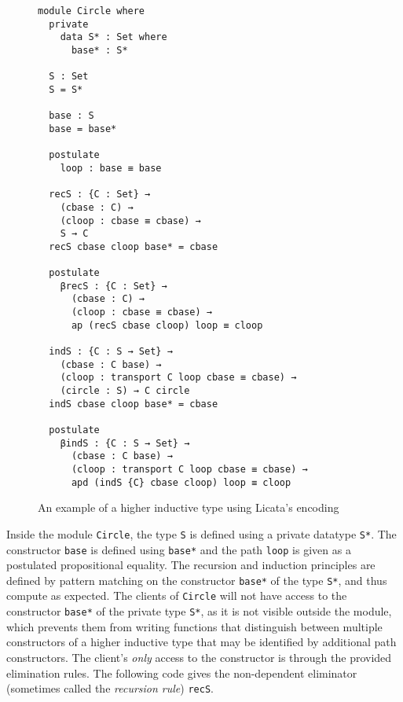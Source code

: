 \documentclass[sigplan,10pt]{acmart}
\begin{document}
\begin{figure}
\begin{center}
\begingroup
\begin{Verbatim}
module Circle where
  private
    data S* : Set where
      base* : S*

  S : Set
  S = S*

  base : S
  base = base*

  postulate
    loop : base ≡ base

  recS : {C : Set} →
    (cbase : C) →
    (cloop : cbase ≡ cbase) →
    S → C
  recS cbase cloop base* = cbase

  postulate
    βrecS : {C : Set} →
      (cbase : C) →
      (cloop : cbase ≡ cbase) →
      ap (recS cbase cloop) loop ≡ cloop

  indS : {C : S → Set} →
    (cbase : C base) →
    (cloop : transport C loop cbase ≡ cbase) →
    (circle : S) → C circle
  indS cbase cloop base* = cbase

  postulate
    βindS : {C : S → Set} →
      (cbase : C base) →
      (cloop : transport C loop cbase ≡ cbase) →
      apd (indS {C} cbase cloop) loop ≡ cloop
\end{Verbatim}
\endgroup
\end{center}
\caption{An example of a higher inductive type using Licata's encoding}
\label{fig:circle-hit}
\end{figure}

Inside the module {\tt Circle}, the type {\tt S} is defined using a private datatype {\tt S*}.
The constructor {\tt base} is defined using {\tt base*} and the path {\tt loop} is given as a postulated propositional equality.
The recursion and induction principles are defined by pattern matching on the constructor {\tt base*} of the type {\tt S*}, and thus compute as expected.
The clients of {\tt Circle} will not have access to the constructor {\tt base*} of the private type {\tt S*}, as it is not visible outside the module, which prevents them from writing functions that distinguish between multiple constructors of a higher inductive type that may be identified by additional path constructors.
The client's \emph{only} access to the constructor is through the provided elimination rules. The following code gives the non-dependent eliminator (sometimes called the \emph{recursion rule}) {\tt recS}.
\end{document}
